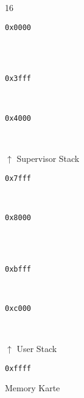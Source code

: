 \documentclass{scrartcl}
\begin{document}
\begin{figure}[h]
	\centering
	\caption{Memory Karte}
	\label{fig:memoryMap}
	\begin{bytefield}[leftcurly=., rightcurly=., leftcurlyspace=0pt, rightcurlyspace=0pt]{16}
		
		\begin{leftwordgroup}{\small \texttt{0x0000}}
		\end{leftwordgroup}\\
		 \\
		\begin{leftwordgroup}{\small \texttt{0x3fff}}
		\end{leftwordgroup}\\

		\begin{leftwordgroup}{\small \texttt{0x4000}}
		\end{leftwordgroup}\\
		\begin{rightwordgroup}{\large $\uparrow$ Supervisor Stack}
			 \\
		\end{rightwordgroup}
		\begin{leftwordgroup}{\small \texttt{0x7fff}}
		\end{leftwordgroup}\\

		\begin{leftwordgroup}{\small \texttt{0x8000}}
		\end{leftwordgroup}\\
			 \\
		\begin{leftwordgroup}{\small \texttt{0xbfff}}
		\end{leftwordgroup}\\

		\begin{leftwordgroup}{\small \texttt{0xc000}}
		\end{leftwordgroup}\\
		\begin{rightwordgroup}{\large $\uparrow$ User Stack}
			 \\
		\end{rightwordgroup}
		\begin{leftwordgroup}{\small \texttt{0xffff}}
		\end{leftwordgroup}

	\end{bytefield}
	
\end{figure}
\end{document}
